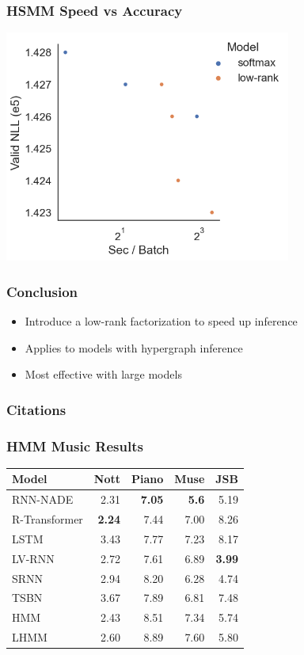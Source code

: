 \documentclass{beamer}
\begin{document}
\begin{frame}
\frametitle{HSMM Speed vs Accuracy}
\centering
\includegraphics[height=3in]{imgs/hmm/hsmm-speed-accuracy.png}
\end{frame}

\begin{frame}
\frametitle{Conclusion}
\begin{itemize}
\item Introduce a low-rank factorization to speed up inference
\vspace{2em}
\item Applies to models with hypergraph inference
\vspace{2em}
\item Most effective with large models
\end{itemize}
\end{frame}


\begin{frame}
\frametitle{Citations}
\printbibliography
\end{frame}


\begin{frame}
\frametitle{HMM Music Results}
\centering
\begin{tabular}{lrrrr}
\toprule
Model       & Nott & Piano & Muse & JSB \\
\midrule
RNN-NADE & 2.31  & \textbf{7.05}        & \textbf{5.6}        & 5.19          \\
R-Transformer & \textbf{2.24} & 7.44 & 7.00 & 8.26 \\
LSTM  & 3.43 & 7.77   & 7.23 & 8.17     \\
LV-RNN    & 2.72       & 7.61        & 6.89       &\textbf{ 3.99}\\
SRNN     & 2.94       & 8.20         & 6.28       & 4.74          \\
\midrule
TSBN     & 3.67       & 7.89        & 6.81       & 7.48          \\
HMM &  2.43 & 8.51 & 7.34 & 5.74 \\
LHMM & 2.60 & 8.89 & 7.60 & 5.80 \\
\bottomrule
\end{tabular}
\end{frame}
\end{document}
